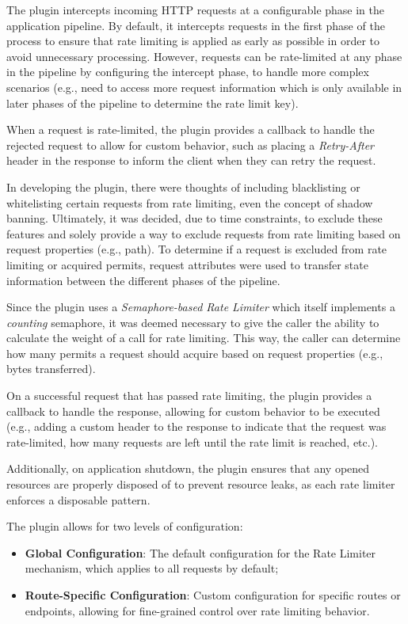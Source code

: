 The plugin intercepts incoming HTTP requests at a configurable phase in the application pipeline.
By default,
it intercepts requests in the first phase of the process
to ensure that rate limiting is applied as early as possible in order to avoid unnecessary processing.
However, requests can be rate-limited at any phase in the pipeline by configuring the intercept phase,
to handle more complex scenarios
(e.g., need to access more request information which is only available in later phases of the pipeline to determine the rate limit key).

When a request is rate-limited,
the plugin provides a callback to handle the rejected request to allow for custom behavior,
such as placing a \textit{Retry-After} header in the response to inform the client when they can retry the request.

In developing the plugin,
there were thoughts of including blacklisting or whitelisting certain requests from rate limiting,
even the concept of shadow banning.
Ultimately,
it was decided, due to time constraints, to exclude these features
and solely provide a way to exclude requests from rate limiting based on request properties (e.g., path).
To determine if a request is excluded from rate limiting or acquired permits,
request attributes were used to transfer state information between the different phases of the pipeline.

Since the plugin uses a \textit{Semaphore-based Rate Limiter} which itself implements a \textit{counting} semaphore,
it was deemed necessary to give the caller the ability to calculate the weight of a call for rate limiting.
This way, the caller can determine how many permits a request should acquire based on request properties (e.g., bytes transferred).

On a successful request that has passed rate limiting, the plugin provides a callback to handle the response,
allowing for custom behavior to be executed (e.g., adding a custom header to the response to indicate that the request was rate-limited, how many requests are left until the rate limit is reached, etc.).

Additionally, on application shutdown,
the plugin ensures that any opened resources are properly disposed of to prevent resource leaks,
as each rate limiter enforces a disposable pattern.

The plugin allows for two levels of configuration:

\begin{itemize}
    \item \textbf{Global Configuration}: The default configuration for the Rate Limiter mechanism, which applies to all requests by default;
    \item \textbf{Route-Specific Configuration}: Custom configuration for specific routes or endpoints, allowing for fine-grained control over rate limiting behavior.
\end{itemize}

